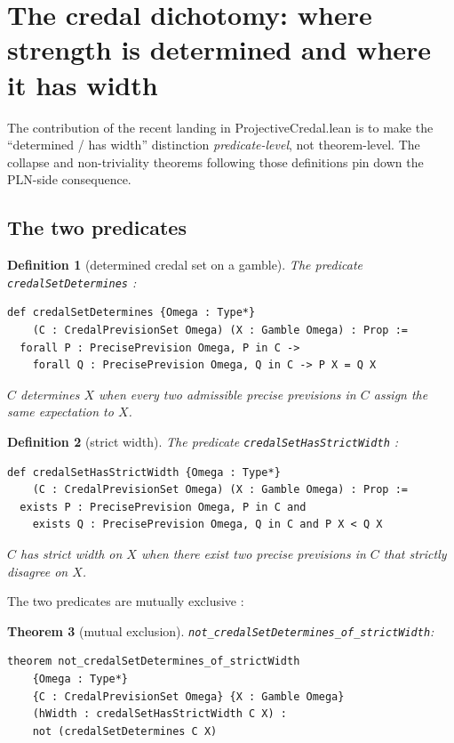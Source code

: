 \documentclass[]{article}
\newtheorem{theorem}{Theorem}
\newtheorem{definition}[theorem]{Definition}
\newcommand{\lid}[1]{{\ttfamily\nolinkurl{#1}}}
\begin{document}
\section{The credal dichotomy: where strength is determined and where it has width}\label{sec:dichotomy}

The contribution of the recent landing in ProjectiveCredal.lean is to
make the ``determined / has width'' distinction \emph{predicate-level},
not theorem-level. The collapse and non-triviality theorems following
those definitions pin down the PLN-side consequence.

\subsection{The two predicates}

\begin{definition}[determined credal set on a gamble]\label{def:determines}
The predicate \lid{credalSetDetermines} :
\begin{lstlisting}
def credalSetDetermines {Omega : Type*}
    (C : CredalPrevisionSet Omega) (X : Gamble Omega) : Prop :=
  forall P : PrecisePrevision Omega, P in C ->
    forall Q : PrecisePrevision Omega, Q in C -> P X = Q X
\end{lstlisting}
$C$ \emph{determines} $X$ when every two admissible precise previsions in
$C$ assign the same expectation to $X$.
\end{definition}

\begin{definition}[strict width]\label{def:strictwidth}
The predicate \lid{credalSetHasStrictWidth} :
\begin{lstlisting}
def credalSetHasStrictWidth {Omega : Type*}
    (C : CredalPrevisionSet Omega) (X : Gamble Omega) : Prop :=
  exists P : PrecisePrevision Omega, P in C and
    exists Q : PrecisePrevision Omega, Q in C and P X < Q X
\end{lstlisting}
$C$ has \emph{strict width} on $X$ when there exist two precise previsions
in $C$ that strictly disagree on $X$.
\end{definition}

The two predicates are mutually exclusive :
\begin{theorem}[mutual exclusion]\label{thm:mutex}
\lid{not\_credalSetDetermines\_of\_strictWidth}:
\begin{lstlisting}
theorem not_credalSetDetermines_of_strictWidth
    {Omega : Type*}
    {C : CredalPrevisionSet Omega} {X : Gamble Omega}
    (hWidth : credalSetHasStrictWidth C X) :
    not (credalSetDetermines C X)
\end{lstlisting}
\end{theorem}
\end{document}
